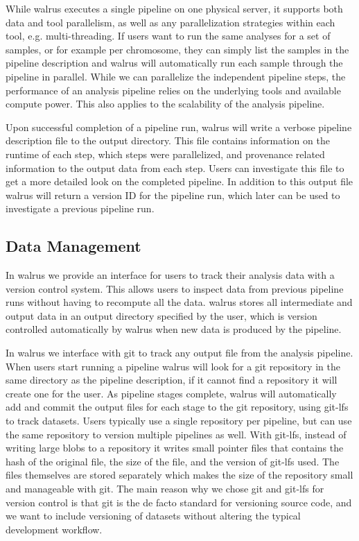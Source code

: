 While walrus executes a single pipeline on one physical server, it supports both
data and tool parallelism, as well as any parallelization strategies within each
tool, e.g. multi-threading. If users want to run the same analyses for a set of
samples, or for example per chromosome, they can simply list the samples in the
pipeline description and walrus will automatically run each sample through the
pipeline in parallel. While we can parallelize the independent pipeline steps,
the performance of an analysis pipeline relies on the underlying tools and
available compute power. This also applies to the scalability of the analysis
pipeline. 

Upon successful completion of a pipeline run, walrus will write a verbose
pipeline description file to the output directory. This file contains
information on the runtime of each step, which steps were parallelized, and
provenance related information to the output data from each step. Users can
investigate this file to get a more detailed look on the completed pipeline. In
addition to this output file walrus will return a version ID for the pipeline
run, which later can be used to investigate a previous pipeline run. 

\subsection{Data Management}
In walrus we provide an interface for users to track their analysis data with a
version control system. This allows users to inspect data from previous pipeline
runs without having to recompute all the data. walrus stores all intermediate
and output data in an output directory specified by the user, which is version
controlled automatically by walrus when new data is produced by the pipeline. 

In walrus we interface with git to track any output file from the analysis
pipeline. When users start running a pipeline walrus will look for a git
repository in the same directory as the pipeline description, if it cannot find
a repository it will create one for the user. As pipeline stages complete,
walrus will automatically add and commit the output files for each stage to the
git repository, using git-lfs to track datasets. Users typically use a single
repository per pipeline, but can use the same repository to version multiple
pipelines as well. With git-lfs, instead of writing large blobs to a repository
it writes small pointer files that contains the hash of the original file, the
size of the file, and the version of git-lfs used. The files themselves are
stored separately which makes the size of the repository small and manageable
with git. The main reason why we chose git and git-lfs for version control is
that git is the de facto standard for versioning source code, and we want to
include versioning of datasets without altering the typical development
workflow. 

